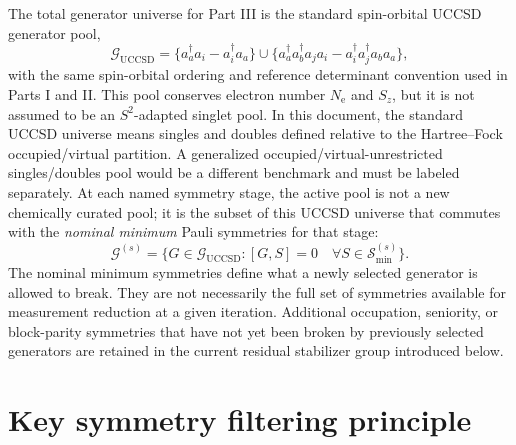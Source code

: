 \documentclass[11pt]{article}
\newcommand{\nelec}{N_{\mathrm e}}
\newcommand{\sz}{S_z}
\newcommand{\uccsd}{\mathcal G_{\mathrm{UCCSD}}}
\newcommand{\stagepool}{\mathcal G^{(s)}}
\newcommand{\minsym}{\mathcal S_{\min}^{(s)}}
\begin{document}
The total generator universe for Part III is the standard spin-orbital UCCSD generator pool,
\begin{equation}
    \uccsd = \{ a_a^\dagger a_i - a_i^\dagger a_a \}
    \cup
    \{ a_a^\dagger a_b^\dagger a_j a_i
       - a_i^\dagger a_j^\dagger a_b a_a \},
\end{equation}
with the same spin-orbital ordering and reference determinant convention used in Parts I and II. This pool conserves electron number $\nelec$ and $\sz$, but it is not assumed to be an $S^2$-adapted singlet pool. In this document, the standard UCCSD universe means singles and doubles defined relative to the Hartree--Fock occupied/virtual partition. A generalized occupied/virtual-unrestricted singles/doubles pool would be a different benchmark and must be labeled separately. At each named symmetry stage, the active pool is not a new chemically curated pool; it is the subset of this UCCSD universe that commutes with the \emph{nominal minimum} Pauli symmetries for that stage:
\begin{equation}
    \stagepool
    = \{G\in \uccsd : [G,S]=0\quad \forall S\in \minsym\}.
    \label{eq:stagepool}
\end{equation}
The nominal minimum symmetries define what a newly selected generator is allowed to break. They are not necessarily the full set of symmetries available for measurement reduction at a given iteration. Additional occupation, seniority, or block-parity symmetries that have not yet been broken by previously selected generators are retained in the current residual stabilizer group introduced below.

\section{Key symmetry filtering principle}
\end{document}
